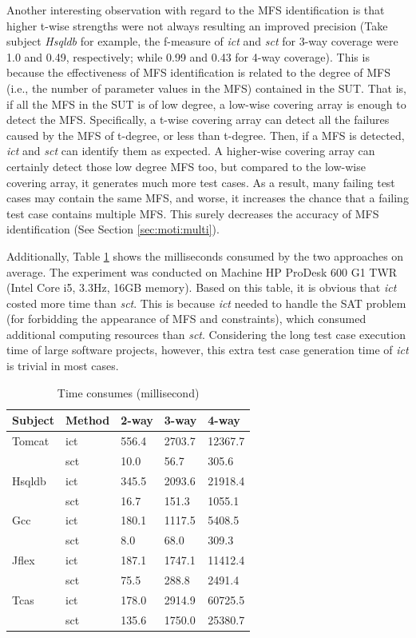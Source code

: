 \documentclass[10pt,journal,compsoc]{IEEEtran}
\begin{document}
Another interesting observation with regard to the MFS identification is that higher t-wise strengths were not always resulting an improved precision (Take subject \emph{Hsqldb} for example, the f-measure of  \emph{ict} and \emph{sct} for 3-way coverage were 1.0 and 0.49, respectively; while 0.99 and 0.43 for 4-way coverage).  This is because the effectiveness of MFS identification is related to the degree of MFS (i.e., the number of parameter values in the MFS) contained in the SUT. That is, if all the MFS in the SUT is of low degree, a low-wise covering array is enough to detect the MFS. Specifically, a t-wise covering array can detect all the failures caused by the MFS of t-degree, or less than t-degree. Then, if a MFS is detected, \emph{ict} and \emph{sct} can identify them as expected. A higher-wise covering array can certainly detect those low degree MFS too, but compared to the low-wise covering array, it generates much more test cases. As a result, many failing test cases may contain the same MFS, and worse, it increases the chance that a failing test case contains multiple MFS. This surely decreases the accuracy of MFS identification (See Section \ref{sec:moti:multi}).

Additionally, Table \ref{time_needs} shows the milliseconds consumed by the two approaches on average. The experiment was conducted on Machine HP ProDesk 600 G1 TWR (Intel Core i5, 3.3Hz, 16GB memory). Based on this table, it is obvious that \emph{ict} costed more time than \emph{sct}. This is because \emph{ict} needed to handle the SAT problem (for forbidding the appearance of MFS and constraints), which consumed additional computing resources than \emph{sct}. Considering the long test case execution time of large software projects, however, this extra test case generation time of \emph{ict} is trivial in most cases.

\begin{table}[ht]
\centering
\caption{Time consumes (millisecond)}
\label{time_needs}
\begin{tabular}{|ll|lll|}
\hline
Subject & Method & 2-way       & 3-way       & 4-way       \\ \hline
Tomcat	&ict	&556.4	&2703.7	&12367.7	\\
	&sct	&10.0	&56.7	&305.6	\\\hline
Hsqldb	&ict	&345.5	&2093.6	&21918.4	\\
	&sct	&16.7	&151.3	&1055.1	\\\hline
Gcc	&ict	&180.1	&1117.5	&5408.5	\\
	&sct	&8.0	&68.0	&309.3	\\\hline
Jflex	&ict	&187.1	&1747.1	&11412.4	\\
	&sct	&75.5	&288.8	&2491.4	\\\hline
Tcas	&ict	&178.0	&2914.9	&60725.5	\\
	&sct	&135.6	&1750.0	&25380.7	\\\hline
\end{tabular}
\end{table}
\end{document}
